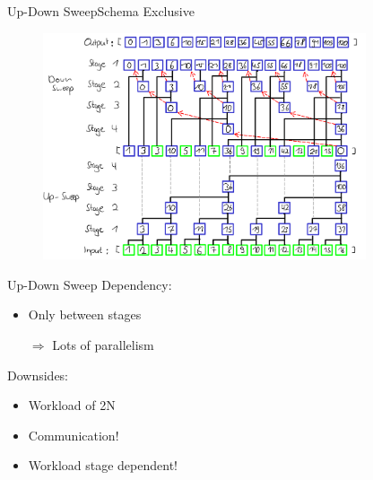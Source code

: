 \begin{frame}{Up-Down Sweep}{Schema Exclusive}
 \begin{figure}
  \centering
  \includegraphics[width=0.85\textwidth]{wiki/ExclusiveUpDown}
 \end{figure}
\end{frame}

\begin{frame}{Up-Down Sweep}
Dependency:
\begin{itemize}
 \item Only between stages
 \item[$\Rightarrow$] Lots of parallelism
\end{itemize}
\vspace{10pt}
Downsides:
\begin{itemize}
 \item Workload of 2N
 \item Communication!
 \item Workload stage dependent!
\end{itemize}

\end{frame}
